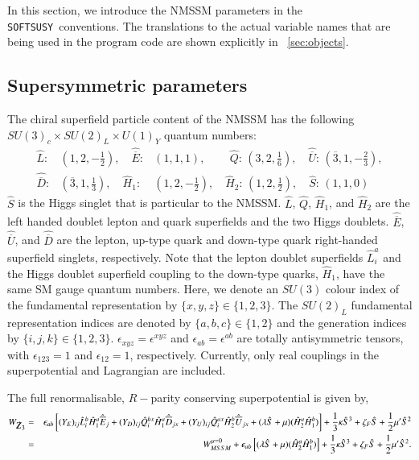 \documentclass[final,3p,times,pdflatex]{elsarticle}
\def\SOFTSUSY{{\tt SOFTSUSY}}
\newcommand{\ba}{\begin{eqnarray}}
\newcommand{\ea}{\end{eqnarray}}
\newcommand{\Zv}{{\mbox{$\slashed{Z}_{3}$}}} %
\begin{document}
In this section, we introduce the NMSSM parameters
in the \SOFTSUSY~conventions. The translations to the actual variable
names that are being used in the program code are shown explicitly in
~\ref{sec:objects}. 



\subsection{Supersymmetric parameters \label{susypars}}
The chiral superfield particle content of the NMSSM has the 
following $SU(3)_c\times SU(2)_L\times U(1)_Y$ quantum numbers:
\begin{eqnarray}
\hat{L}:&(1,2,-\frac{1}{2}),\quad \hat{{\overline E}}:&(1,1,1),\qquad\, \hat{Q}:\,(3,2,\frac{1}{6}),\quad
\hat{{\overline U}}:\,(\overline 3,1,-\frac{2}{3}),\nonumber\\ \hat{{\overline D}}:&(\overline 3,1,\frac{1}{3}),\quad
\hat{H}_1:&(1,2,-\frac{1}{2}),\quad \hat{H}_2:\,(1,2,\frac{1}{2}),\quad \hat{S}:\,(1,1,0)
\label{fields}
\end{eqnarray}
$\hat S$ is the Higgs singlet that is particular to the NMSSM.
$\hat L$, $\hat Q$, $\hat H_1$, and $\hat H_2$ are the left handed doublet lepton and
quark superfields and the two Higgs doublets. $\hat{\overline E}$, $\hat{\overline U}$, and
$\hat{\overline D}$ are the lepton, up-type quark and down-type quark
right-handed superfield singlets, respectively. 
Note that the lepton
doublet superfields $\hat{L}^a_i$ and the Higgs doublet superfield coupling
to the down-type quarks, $\hat{H}_1$, have the same SM gauge 
quantum numbers. 
Here, we denote an $SU(3)$ colour index of the fundamental
representation by  $\{x,y,z\} \in \{1,2,3 \}$. The $SU(2)_L$ fundamental
representation indices are denoted by $\{a,b,c\} \in \{1,2\}$ and the generation
indices by $\{i,j,k\} \in \{1,2,3\}$. 
$\epsilon_{xyz}=\epsilon^{xyz}$ and  $\epsilon_{ab}=\epsilon^{ab}$ are totally
antisymmetric tensors, with $\epsilon_{123}=1$ and $\epsilon_{12}=1$,
respectively.  Currently, only real couplings in the superpotential and Lagrangian are included. 

The full renormalisable, $R-$parity conserving superpotential is given by,
\ba 
 W_{\Zv}  &=&  \epsilon_{ab} \left[ (Y_E)_{ij} \hat L_i^b
\hat H_1^a \hat{\overline E}_j + (Y_D)_{ij} \hat Q_i^{bx} \hat H_1^a \hat{\overline D}_{jx} +
(Y_U)_{ij} \hat Q_i^{ax} \hat H_2^b \hat{\overline U}_{jx} 
+(\lambda \hat{S} + \mu)(\hat{H}^a_2 \hat{H}^b_1) \right ] +\frac{1}{3}\kappa\hat{S}^3 + \zeta_F\hat{S} + \frac{1}{2} \mu^\prime\hat{S}^2 \\
 &=& W_{MSSM}^{\mu =0}  +  \epsilon_{ab}\left [(\lambda \hat{S} + \mu)(\hat{H}^a_2 \hat{H}^b_1) \right ]+\frac{1}{3}\kappa\hat{S}^3 + \zeta_F\hat{S} + \frac{1}{2} \mu^\prime\hat{S}^2. 
\label{eq:WZ3V}
\ea
 
\end{document}
